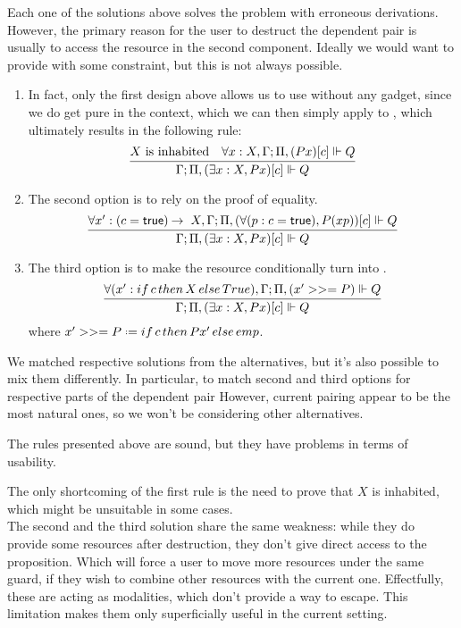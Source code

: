 {Each one of the solutions above solves the problem with erroneous derivations.
However, the primary reason for the user to destruct the dependent pair is usually to access the resource in the second component.
Ideally we would want to provide  with some constraint, but this is not always possible.

\begin{enumerate}
\item In fact, only the first design above allows us to use  without any gadget, since we do get pure  in the context, which we can then simply apply to , which ultimately results in the following rule:
  \[
    \infer{\entails {\IntuD} {\SpatD, (\exists x : X, P x)[c]} {Q}}
          {X \text{ is inhabited} &
           \forall x : X , \entails {\IntuD} {\SpatD, (P x)[c]} {Q}}
  \]
\item The second option is to rely on the proof of equality.
    \[
    \infer{\entails {\IntuD} {\SpatD, (\exists x : X, P x)[c]} {Q}}
          {\forall x' : (c = \true) \imp X , \entails {\IntuD} {\SpatD, (\forall (p : c = \true), P (x p))[c]} {Q}}
    \]
\item The third option is to make the resource conditionally turn into \emp.
   \[
    \infer{\entails {\IntuD} {\SpatD, (\exists x : X, P x)[c]} {Q}}
          {\forall (x' : \mathop{if} c \mathop{then} X \mathop{else} True), \entails {\IntuD} {\SpatD, (x' >>= P)} {Q}}
   \]
   where \(x' >>= P \defeq \mathop{if} c \mathop{then} P x' \mathop{else} emp\).
\end{enumerate}

We matched respective solutions from the alternatives, but it's also possible to mix them differently.
In particular, to match second and third options for respective parts of the dependent pair
However, current pairing appear to be the most natural ones, so we won't be considering other alternatives.

The rules presented above are sound, but they have problems in terms of usability.

The only shortcoming of the first rule is the need to prove that \(X\) is inhabited, which might be unsuitable in some cases.\\
The second and the third solution share the same weakness: while they do provide some resources after destruction, they don't give direct access to the proposition.
Which will force a user to move more resources under the same guard, if they wish to combine other resources with the current one.
Effectfully, these are acting as modalities, which don't provide a way to escape.
This limitation makes them only superficially useful in the current setting.

}
